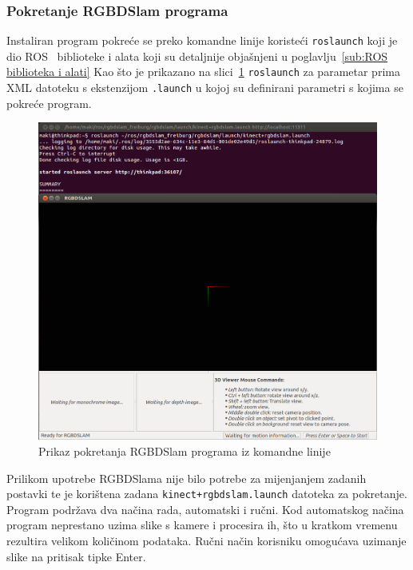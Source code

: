
\newpage
\subsubsection{Pokretanje RGBDSlam programa} %
\label{ssub:Pokretanje RGBDSlam programa}

Instaliran program pokreće se preko komandne linije koristeći
\texttt{roslaunch} koji je dio ROS~\cite{ros} biblioteke i alata
koji su detaljnije objašnjeni u poglavlju~\ref{sub:ROS biblioteka i
alati} Kao što je prikazano na slici~\ref{fig:running-rgbdslam}
\texttt{roslaunch} za parametar prima XML datoteku s ekstenzijom
\texttt{.launch} u kojoj su definirani parametri s kojima se pokreće
program.

\setcounter{figure}{0}
\begin{figure}[h]
\centering
\includegraphics[scale=0.39]{figures/running-rgbdslam.png}
\caption{Prikaz pokretanja RGBDSlam programa iz komandne linije}
\label{fig:running-rgbdslam}
\end{figure}

Prilikom upotrebe RGBDSlama nije bilo potrebe za mijenjanjem zadanih
postavki te je korištena zadana \texttt{kinect+rgbdslam.launch}
datoteka za pokretanje. Program podržava dva načina rada, automatski i
ručni. Kod automatskog načina program neprestano uzima slike s kamere i
procesira ih, što u kratkom vremenu rezultira velikom količinom
podataka. Ručni način korisniku omogućava uzimanje slike na pritisak
tipke Enter.

